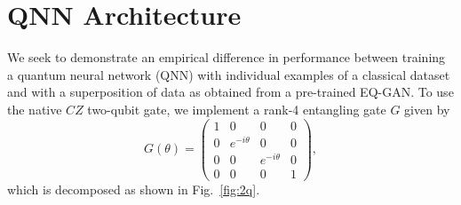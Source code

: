 \documentclass[prl,superscriptaddress,twocolumn]{revtex4}
\theoremstyle{plain}
\theoremstyle{definition}
\begin{document}

\section{QNN Architecture}%
We seek to demonstrate an empirical difference in performance between training a quantum neural network (QNN) with individual examples of a classical dataset and with a superposition of data as obtained from a pre-trained EQ-GAN.  To use the native $CZ$ two-qubit gate, we implement a rank-4 entangling gate $G$ given by
\begin{equation}
    \label{eq:2q}
    G(\theta) = \begin{pmatrix}
    1 & 0 & 0 & 0\\
    0 & e^{-i\theta} & 0 & 0\\
    0 & 0 & e^{-i\theta} & 0\\
    0 & 0 & 0 & 1
    \end{pmatrix},
\end{equation}
which is decomposed as shown in Fig.~\ref{fig:2q}.
\end{document}
